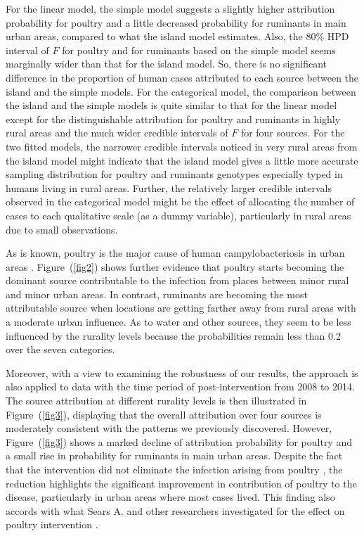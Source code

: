 \documentclass[times, doublespace]{WileyNJD-v2}%
\begin{document}
%
For the linear model, the simple model suggests a slightly higher attribution probability for poultry and a little decreased probability for ruminants in main urban areas, compared to what the island model estimates. Also, the 80\% HPD interval of $F$ for poultry and for ruminants based on the simple model seems marginally wider than that for the island model. So, there is no significant difference in the proportion of human cases attributed to each source between the island and the simple models. For the categorical model, the comparison between the island and the simple models is quite similar to that for the linear model except for the distinguishable attribution for poultry and ruminants in highly rural areas and the much wider credible intervals of $F$ for four sources. For the two fitted models, the narrower credible intervals noticed in very rural areas from the island model might indicate that the island model gives a little more accurate sampling distribution for poultry and ruminants genotypes especially typed in humans living in rural areas. Further, the relatively larger credible intervals observed in the categorical model might be the effect of allocating the number of cases to each qualitative scale (as a dummy variable), particularly in rural areas due to small observations.

As is known, poultry is the major cause of human campylobacteriosis in urban areas \cite{MullA, Marsh, MullM}. Figure~(\ref{fig2}) shows further evidence that poultry starts becoming the dominant source contributable to the infection from places between minor rural and minor urban areas. In contrast, ruminants are becoming the most attributable source when locations are getting farther away from rural areas with a moderate urban influence. As to water and other sources, they seem to be less influenced by the rurality levels because the probabilities remain less than 0.2 over the seven categories.

Moreover, with a view to examining the robustness of our results, the approach is also applied to data with the time period of post-intervention from 2008 to 2014. The source attribution at different rurality levels is then illustrated in Figure~(\ref{fig3}), displaying that the overall attribution over four sources is moderately consistent with the patterns we previously discovered. However, Figure~(\ref{fig3}) shows a marked decline of attribution probability for poultry and a small rise in probability for ruminants in main urban areas. Despite the fact that the intervention did not eliminate the infection arising from poultry \cite{MuelM}, the reduction highlights the significant improvement in contribution of poultry to the disease, particularly in urban areas where most cases lived. This finding also accords with what Sears A. and other researchers investigated for the effect on poultry intervention \cite{AnnS}. 
\end{document}
